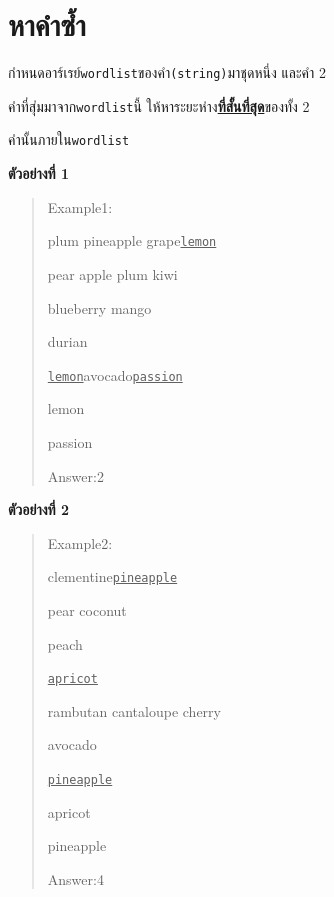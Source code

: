 \documentclass{article}
\begin{document}
\section*{หาคำซ้ำ}

กำหนดอาร์เรย์\texttt{wordlist}ของคำ\texttt{(string)}มาชุดหนึ่ง และคำ 2

คำที่สุ่มมาจาก\texttt{wordlist}นี้ ให้หาระยะห่าง\textbf{\ul{ที่สั้นที่สุด}}ของทั้ง 2

คำนั้นภายใน\texttt{wordlist}



\hfill\break



\textbf{ตัวอย่างที่ 1}



\begin{quote}

{Example1:}



{plum pineapple grape}\ul{\mbox{\texttt{lemon}}}{}{pear apple plum kiwi

blueberry mango

durian}\ul{\mbox{\texttt{lemon}}}{avocado}\ul{\mbox{\texttt{passion}}}



{lemon}



{passion}



{Answer:}{2}

\end{quote}



\textbf{ตัวอย่างที่ 2}



\begin{quote}

{Example2:}



{clementine}\ul{\mbox{\texttt{pineapple}}}{pear coconut

peach}\ul{\mbox{\texttt{apricot}}}{rambutan cantaloupe cherry

avocado}\ul{\mbox{\texttt{pineapple}}}



{apricot}



{pineapple}



{Answer:}{4}

\end{quote}
\end{document}
